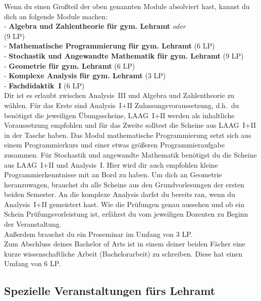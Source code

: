 Wenn du einen Großteil der oben genannten Module absolviert hast,
kannst du dich an folgende Module machen:\\[6pt]
- {\bf Algebra und Zahlentheorie für gym. Lehramt} {\em oder}\\[2pt]
    (9 LP)\\[2pt]
- {\bf Mathematische Programmierung für gym. Lehramt} (6 LP)\\[2pt]
- {\bf Stochastik und Angewandte Mathematik für gym. Lehramt} (9 LP)\\[2pt]
- {\bf Geometrie für gym. Lehramt} (6 LP)\\[2pt]
- {\bf Komplexe Analysis für gym. Lehramt} (3 LP)\\[2pt]
- {\bf Fachdidaktik~I} (6 LP)\\[6pt]
Dir ist es erlaubt zwischen Analysis~III und Algebra und Zahlentheorie zu wählen.
Für das Erste sind Analysis~I+II Zulassungsvoraussetzung,
d.h.\ du benötigst die jeweiligen Übungsscheine,
LAAG~I+II werden als inhaltliche Voraussetzung empfohlen
und für das Zweite solltest die Scheine aus LAAG~I+II in der Tasche haben.
Das Modul mathematische Programmierung setzt sich aus einem
Programmierkurs und einer etwas größeren Programmieraufgabe zusammen.
Für Stochastik und angewandte Mathematik benötigst du die Scheine aus LAAG~I+II
und Analysis~I.
Hier wird dir auch empfohlen kleine Programmierkenntnisse mit an Bord zu haben.
Um dich an Geometrie heranzuwagen, brauchst du alle Scheine aus den Grundvorlesungen der ersten beiden Semester.
An die komplexe Analysis darfst du bereits ran, wenn du Analysis~I+II gemeistert hast. 
Wie die Prüfungen genau aussehen
und ob ein Schein Prüfungsvorleistung ist,
erfährst du vom jeweiligen Dozenten zu Beginn der Veranstaltung. \\
Außerdem brauchst du ein Proseminar im Umfang von 3 LP.\\ 
Zum Abschluss deines Bachelor of Arts ist in einem deiner beiden Fächer
eine kurze wissenschaftliche Arbeit (Bachelorarbeit) zu schreiben.
Diese hat einen Umfang von 6 LP.


\subsection{Spezielle Veranstaltungen fürs Lehramt}

